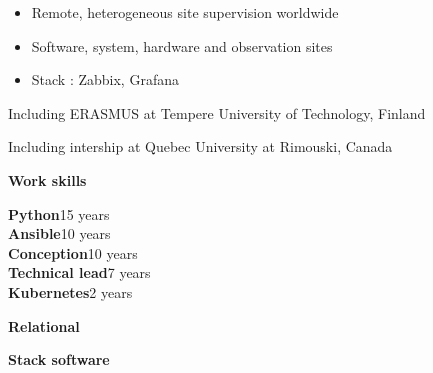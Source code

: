 \documentclass[10pt,a4paper,ragged2e,withhyper]{altacv}
\begin{document}
\begin{paracol}{2}
\divider

\begin{itemize}
\item Remote, heterogeneous site supervision worldwide
\item Software, system, hardware and observation sites
\item Stack : Zabbix, Grafana

\end{itemize}

\medskip
{}

Including ERASMUS at Tempere University of Technology, Finland

\divider

Including intership at Quebec University at Rimouski, Canada


\switchcolumn


\textbf{\color{accent}\large{Work skills}}\par\medskip

\textcolor{emphasis}{\textbf{Python}}\hfill 15 years  \\
\textcolor{emphasis}{\textbf{Ansible}}\hfill 10 years\\
\textcolor{emphasis}{\textbf{Conception}}\hfill 10 years\\
\textcolor{emphasis}{\textbf{Technical lead}}\hfill 7 years\\
\textcolor{emphasis}{\textbf{Kubernetes}}\hfill 2 years\\
\divider

\textbf{\color{accent}\large{Relational}}\par\medskip


\divider

\textbf{\color{accent}\large{Stack software}}\par\medskip


\divider


\end{paracol}
\end{document}
